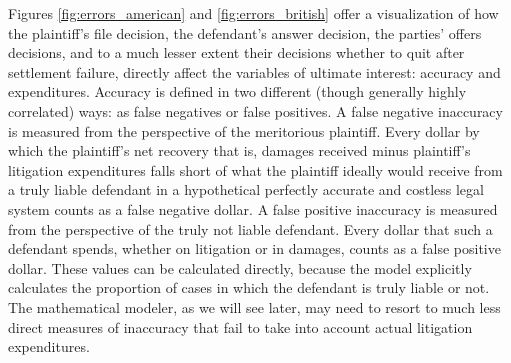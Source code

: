 \documentclass{article}
\begin{document}
Figures \ref{fig:errors_american} and \ref{fig:errors_british} offer a visualization of how the plaintiff's file decision, the defendant's answer decision, the parties' offers decisions, and to a much lesser extent their decisions whether to quit after settlement failure, directly affect the variables of ultimate interest: accuracy and expenditures. Accuracy is defined in two different (though generally highly correlated) ways: as false negatives or false positives. A false negative inaccuracy is measured from the perspective of the meritorious plaintiff. Every dollar by which the plaintiff's net recovery \textemdash that is, damages received minus plaintiff's litigation expenditures \textemdash falls short of what the plaintiff ideally would receive from a truly liable defendant in a hypothetical perfectly accurate and costless legal system counts as a false negative dollar. A false positive inaccuracy is measured from the perspective of the truly not liable defendant. Every dollar that such a defendant spends, whether on litigation or in damages, counts as a false positive dollar. These values can be calculated directly, because the model explicitly calculates the proportion of cases in which the defendant is truly liable or not. The mathematical modeler, as we will see later, may need to resort to much less direct measures of inaccuracy that fail to take into account actual litigation expenditures.
\end{document}

